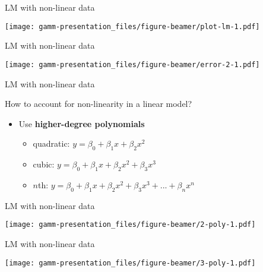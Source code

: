 \documentclass[ignorenonframetext,]{beamer}
\providecommand{\tightlist}{%
  \setlength{\itemsep}{0pt}\setlength{\parskip}{0pt}}
\begin{document}
\begin{frame}{LM with non-linear data}
\protect\hypertarget{lm-with-non-linear-data-1}{}

\texttt{[image: gamm-presentation\_files/figure-beamer/plot-lm-1.pdf]}

\end{frame}

\begin{frame}{LM with non-linear data}
\protect\hypertarget{lm-with-non-linear-data-2}{}

\texttt{[image: gamm-presentation\_files/figure-beamer/error-2-1.pdf]}

\end{frame}

\begin{frame}{LM with non-linear data}
\protect\hypertarget{lm-with-non-linear-data-3}{}

How to account for non-linearity in a linear model?

\begin{itemize}
\tightlist
\item
  Use \textbf{higher-degree polynomials}

  \begin{itemize}
  \tightlist
  \item
    quadratic: \(y = \beta_0 + \beta_1x + \beta_2x^2\)
  \item
    cubic: \(y = \beta_0 + \beta_1x + \beta_2x^2 + \beta_3x^3\)
  \item
    \(n\)th:
    \(y = \beta_0 + \beta_1x + \beta_2x^2 + \beta_3x^3 + ... + \beta_nx^n\)
  \end{itemize}
\end{itemize}

\end{frame}

\begin{frame}{LM with non-linear data}
\protect\hypertarget{lm-with-non-linear-data-4}{}

\texttt{[image: gamm-presentation\_files/figure-beamer/2-poly-1.pdf]}

\end{frame}

\begin{frame}{LM with non-linear data}
\protect\hypertarget{lm-with-non-linear-data-5}{}

\texttt{[image: gamm-presentation\_files/figure-beamer/3-poly-1.pdf]}

\end{frame}
\end{document}
